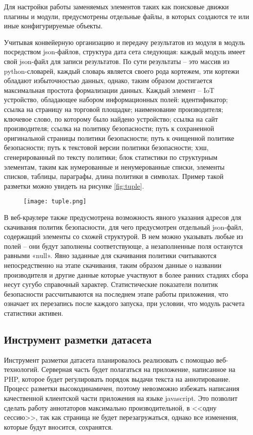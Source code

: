 \documentclass[../main]{subfiles}
\begin{document}
Для настройки работы заменяемых элементов таких как поисковые движки плагины и модули, предусмотрены отдельные файлы, в которых создаются те или иные конфигурируемые объекты.

Учитывая конвейерную организацию и передачу результатов из модуля в модуль посредством json-файлов, структура дата сета следующая: каждый модуль имеет свой json-файл для записи результатов. По сути результаты – это массив из python-словарей, каждый словарь является своего рода кортежем, эти кортежи обладают избыточностью данных, однако, таким образом достигается максимальная простота формализации данных. Каждый элемент – IoT устройство, обладающее набором информационных полей: идентификатор; ссылка на страницу на торговой площадке; наименование производителя; ключевое слово, по которому было найдено устройство; ссылка на сайт производителя; ссылка на политику безопасности; путь к сохраненной оригинальной страницы политики безопасности; путь к очищенной политике безопасности; путь к текстовой версии политики безопасности; хэш, сгенерированный по тексту политики; блок статистики по структурным элементам, таким как нумерованные и ненумерованные списки, элементы списков, таблицы, параграфы, длина политики в символах. Пример такой разметки можно увидеть на рисунке \ref{fig:tuple}.

\begin{figure}[H]
    \centering
    {\texttt{[image: tuple.png]}}
    \vspace{-\baselineskip}
\end{figure}

В веб-краулере также предусмотрена возможность явного указания адресов для скачивания политик безопасности, для чего предусмотрен отдельный json-файл, содержащий элементы со схожей структурой. В нем можно указывать любые из полей – они будут заполнены соответствующе, а незаполненные поля останутся равными «null». Явно заданные для скачивания политики считываются непосредственно на этапе скачивания, таким образом данные о названии производителя и другие данные которые участвуют в более ранних стадиях сбора несут сугубо справочный характер. Статистические показатели политик безопасности рассчитываются на последнем этапе работы приложения, что означает их перезапись после каждого запуска, при условии, что модуль расчета статистики активен.

\subsection{Инструмент разметки датасета}
Инструмент разметки датасета планировалось реализовать с помощью веб-технологий. Серверная часть будет полагаться на приложение, написанное на PHP, которое будет регулировать порядок выдачи текста на аннотирование. Процесс разметки высокодинамичен, поэтому невозможно избежать написания качественной клиентской части приложения на языке javascript. Это позволит сделать работу аннотаторов максимально производительной, в <<одну сессию>>, так как страница не будет перезагружаться, однако все изменения, которые будут вносится, сохранятся.
\end{document}
